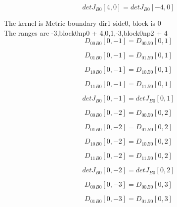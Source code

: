 \documentclass{article}
\begin{document}
\begin{dmath}{detJ{_{B0}}}[{4,0}] = {detJ{_{B0}}}[{-4,0}]\end{dmath}

\noindent The kernel is Metric boundary dir1 side0, block is 0\\\noindent The ranges are -3,block0np0 + 4,0,1,-3,block0np2 + 4\\\begin{dmath}{D_{00}{_{B0}}}[{0,-1}] = {D_{00}{_{B0}}}[{0,1}]\end{dmath}

\begin{dmath}{D_{01}{_{B0}}}[{0,-1}] = {D_{01}{_{B0}}}[{0,1}]\end{dmath}

\begin{dmath}{D_{10}{_{B0}}}[{0,-1}] = {D_{10}{_{B0}}}[{0,1}]\end{dmath}

\begin{dmath}{D_{11}{_{B0}}}[{0,-1}] = {D_{11}{_{B0}}}[{0,1}]\end{dmath}

\begin{dmath}{detJ{_{B0}}}[{0,-1}] = {detJ{_{B0}}}[{0,1}]\end{dmath}

\begin{dmath}{D_{00}{_{B0}}}[{0,-2}] = {D_{00}{_{B0}}}[{0,2}]\end{dmath}

\begin{dmath}{D_{01}{_{B0}}}[{0,-2}] = {D_{01}{_{B0}}}[{0,2}]\end{dmath}

\begin{dmath}{D_{10}{_{B0}}}[{0,-2}] = {D_{10}{_{B0}}}[{0,2}]\end{dmath}

\begin{dmath}{D_{11}{_{B0}}}[{0,-2}] = {D_{11}{_{B0}}}[{0,2}]\end{dmath}

\begin{dmath}{detJ{_{B0}}}[{0,-2}] = {detJ{_{B0}}}[{0,2}]\end{dmath}

\begin{dmath}{D_{00}{_{B0}}}[{0,-3}] = {D_{00}{_{B0}}}[{0,3}]\end{dmath}

\begin{dmath}{D_{01}{_{B0}}}[{0,-3}] = {D_{01}{_{B0}}}[{0,3}]\end{dmath}
\end{document}
